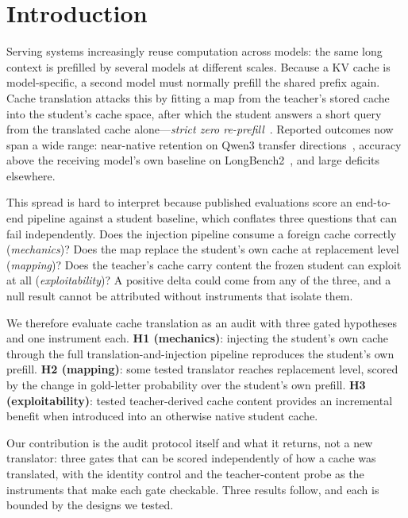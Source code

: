 \documentclass{article} %
\newcommand{\kv}{\ensuremath{\mathrm{KV}}}
\begin{document}

\section{Introduction}
\label{sec:intro}

Serving systems increasingly reuse computation across models: the same long
context is prefilled by several models at different scales. Because a \kv{}
cache is model-specific, a second model must normally prefill the shared prefix
again. Cache translation attacks this by fitting a map from the teacher's stored
cache into the student's cache space, after which the student answers a short
query from the translated cache alone---\emph{strict zero
re-prefill}~\citep{c2c2025,lsc2026,mot2026,heo2026,cachebridge2026,contextreuse2026}.
Reported outcomes now span a wide range: near-native retention on Qwen3
transfer directions~\citep{cachebridge2026}, accuracy above the receiving
model's own baseline on LongBench2~\citep{contextreuse2026}, and large deficits
elsewhere.

This spread is hard to interpret because published evaluations score an
end-to-end pipeline against a student baseline, which conflates three questions
that can fail independently. Does the injection pipeline consume a foreign
cache correctly (\emph{mechanics})? Does the map replace the student's own cache
at replacement level (\emph{mapping})? Does the teacher's cache carry content
the frozen student can exploit at all (\emph{exploitability})? A positive delta
could come from any of the three, and a null result cannot be attributed
without instruments that isolate them.

We therefore evaluate cache translation as an audit with three gated
hypotheses and one instrument each.
\textbf{H1 (mechanics)}: injecting the student's own cache through the full
translation-and-injection pipeline reproduces the student's own prefill.
\textbf{H2 (mapping)}: some tested translator reaches replacement level, scored
by the change in gold-letter probability over the student's own prefill.
\textbf{H3 (exploitability)}: tested teacher-derived cache content provides an
incremental benefit when introduced into an otherwise native student cache.

Our contribution is the audit protocol itself and what it returns, not a new
translator: three gates that can be scored independently of how a cache was
translated, with the identity control and the teacher-content probe as the
instruments that make each gate checkable. Three results follow, and each is
bounded by the designs we tested.
\end{document}
